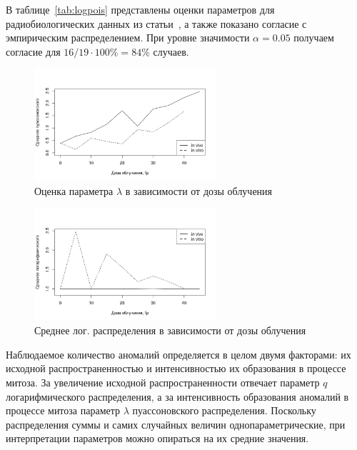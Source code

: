 \documentclass{math-mech-sci}
\begin{document}
	В таблице~\ref{tab:logpois} представлены оценки параметров для радиобиологических данных из статьи~\cite{bib:alexeeva2008}, а также показано согласие с эмпирическим распределением.
	При уровне значимости $\alpha = 0.05$ получаем согласие для $16 / 19 \cdot 100 \% = 84 \%$ случаев. 
	
	
	\begin{figure}[!h]
		\centering
		\includegraphics[width = 0.6\textwidth]{logpoismeanpois}
		\caption{Оценка параметра $\lambda$  в зависимости от дозы облучения}
		\label{img:logpoismeanpois}
	\end{figure}
	
	\begin{figure}[!h]
		\centering
		\includegraphics[width = 0.6\textwidth]{logpoismeanlog}
		\caption{Среднее  лог. распределения  в зависимости от дозы облучения}
		\label{img:logpoismeanlog}
	\end{figure}

	Наблюдаемое количество аномалий определяется в целом двумя факторами: их исходной распространенностью и интенсивностью их образования в процессе митоза. За увеличение исходной  распространенности отвечает параметр $q$ логарифмического распределения, а за интенсивность образования аномалий в процессе митоза параметр $\lambda$  пуассоновского распределения. Поскольку распределения  суммы и самих случайных величин однопараметрические, при интерпретации  параметров можно опираться на их средние значения.
	
\end{document}
